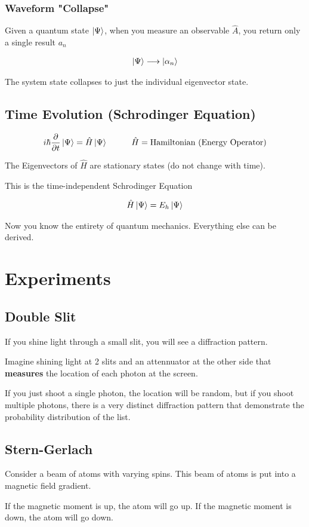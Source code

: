 \documentclass[fleqn]{report}
\newcommand{\hp}{\hspace{1cm}}
\newcommand{\del}{\partial}
\newcommand{\equations} [1] {
\begin{gather*}
#1
\end{gather*}
}
\begin{document}
\subsection{Waveform "Collapse"}
Given a quantum state $\ket{\Psi}$, when you measure 
an observable $\hat A$, you return only a single result $a_n$

\equations{
    \ket{\Psi}
    \longrightarrow 
    \ket{\alpha_n}
}
The system state collapses to just the individual eigenvector state. 

\section{Time Evolution (Schrodinger Equation)}
\equations{
    i \hbar \frac{\del}{\del t} \ket{\Psi}
    =
    \hat H \ket{\Psi}
    \hp 
    \hat H = 
    \textrm{Hamiltonian (Energy Operator)}
}

The Eigenvectors of $\hat H$ are stationary states (do not change with 
time). 

This is the time-independent Schrodinger Equation 
\equations{
    \hat H \ket{\Psi}
    =
    E_h \ket{\Psi}
}

Now you know the entirety of quantum mechanics. Everything else 
can be derived. 

\chapter{Experiments}
\section{Double Slit}
If you shine light through a small slit, you will see a diffraction 
pattern. 

Imagine shining light at 2 slits and an attennuator at the other 
side that \textbf{measures} the location of each photon at the screen. 

If you just shoot a single photon, the location will be random, but if you
shoot multiple photons, there is a very distinct diffraction pattern that 
demonstrate the probability distribution of the list. 

\section{Stern-Gerlach}
Consider a beam of atoms with varying spins. This beam of atoms is 
put into a magnetic field gradient. 

If the magnetic moment is up, the atom will go up. If the magnetic 
moment is down, the atom will go down. 
\end{document}
